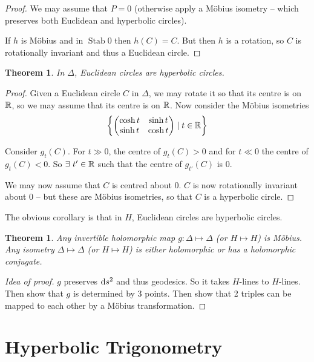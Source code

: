 \documentclass{notes}
\theoremstyle{plain}
\newtheorem{theorem}[proposition]{Theorem}
\DeclareMathOperator{\Stab}{Stab}
\begin{document}
\begin{proof}
We may assume that $P = 0$ (otherwise apply a M\"obius isometry -- which
preserves both Euclidean and hyperbolic circles).

If $h$ is M\"obius and in $\Stab 0$ then $h(C) = C$.  But then $h$ is a
rotation, so $C$ is rotationally invariant and thus a Euclidean circle.
\end{proof}

\begin{theorem}
In $\Delta$, Euclidean circles are hyperbolic circles.
\end{theorem}

\begin{proof}
Given a Euclidean circle $C$ in $\Delta$, we may rotate it so that its centre
is on $\mathbb{R}$, so we may assume that its centre is on $\mathbb{R}$.  Now consider the
M\"obius isometries
\[
\left\{
\left(
\begin{matrix}
\cosh t & \sinh t \\
\sinh t & \cosh t
\end{matrix}
\right) \mid t \in \mathbb{R}
\right\}
\]

Consider $g_t(C)$.  For $t \gg 0$, the centre of $g_t(C) > 0$ and for
$t \ll 0$ the centre of $g_t(C) < 0$.  So $\exists\ t' \in \mathbb{R}$ such that
the centre of $g_{t'}(C)$ is $0$.

We may now assume that $C$ is centred about $0$.  $C$ is now rotationally
invariant about $0$ -- but these are M\"obius isometries, so that $C$ is a
hyperbolic circle.
\end{proof}

The obvious corollary is that in $H$, Euclidean circles are hyperbolic circles.

\begin{theorem}
Any invertible holomorphic map $g : \Delta \mapsto \Delta$ (or $H \mapsto H$)
is M\"obius.  Any isometry $\Delta \mapsto \Delta$ (or $H \mapsto H$) is either
holomorphic or has a holomorphic conjugate.
\end{theorem}

\begin{proof}[Idea of proof]
$g$ preserves $\mathrm{d} s^2$ and thus geodesics.  So it takes $H$-lines to $H$-lines.
Then show that $g$ is determined by 3 points.  Then show that 2 triples can
be mapped to each other by a M\"obius transformation.
\end{proof}

\section{Hyperbolic Trigonometry}
\end{document}
